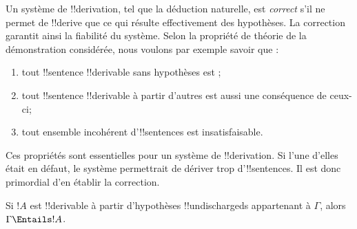 \documentclass[11pt,a4paper,openany]{memoir}
\begin{document}
\begin{explain}
Un système de !!{derivation}, tel que la déduction naturelle, est
\emph{correct} s'il ne permet de !!{derive} que ce qui résulte
effectivement des hypothèses. La correction garantit ainsi la
fiabilité du système. Selon la propriété de théorie de la
démonstration considérée, nous voulons par exemple savoir que :
\begin{enumerate}
\item tout !!{sentence} !!{derivable} sans hypothèses est
  ;
\item tout !!{sentence} !!{derivable} à partir d'autres est
  aussi une conséquence de ceux-ci;
\item tout ensemble incohérent d'!!{sentence}s est insatisfaisable.
\end{enumerate}
Ces propriétés sont essentielles pour un système de !!{derivation}.
Si l'une d'elles était en défaut, le système permettrait de dériver
trop d'!!{sentence}s. Il est donc primordial d'en établir la
correction.
\end{explain}

\begin{thm}[Correction]
Si $!A$ est !!{derivable} à partir d'hypothèses
!!{undischarged}s appartenant à $\Gamma$, alors $\Gamma \Entails !A$.
\end{thm}
\end{document}
